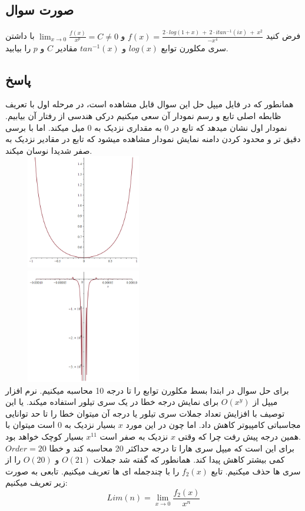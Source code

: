 \documentclass[12pt, letterpaper]{article}
\begin{document}
\subsection{صورت سوال}
فرض کنید
\(f(x) = \frac{2 \cdot log(1+x) \: + \: 2 \cdot i tan^{-1}(ix) \: + \: x^2}{-x^4}\)
و 
\(\lim_{x\to 0}\frac{f(x)}{x^p} = C \ne 0\)
با داشتن سری مکلورن توابع 
\(log(x)\)
و 
\(tan^{-1}(x)\)
مقادیر 
\(C\)
و 
\(p\)
را بیابید.

\subsection{پاسخ}
همانطور که در فایل میپل حل این سوال قابل مشاهده است، در مرحله اول با تعریف ظابطه اصلی تابع و رسم نمودار آن سعی میکنیم درکی هندسی از رفتار آن بیابیم. نمودار اول نشان میدهد که تابع در 0 به مقداری نزدیک به 0 میل میکند. اما با برسی دقیق تر و محدود کردن دامنه نمایش نمودار مشاهده میشود که تابع در مقادیر نزدیک به صفر شدیدا نوسان میکند. \\

\includegraphics[height=5cm, width=7cm]{figure1.png}
\includegraphics[height=5cm, width=7cm]{figure2.png}
\\


برای حل سوال در ابتدا بسط مکلورن توابع را تا درجه 10 محاسبه میکنیم. نرم افزار میپل از
\(O(x^y)\)
 برای نمایش درجه خطا در یک سری تیلور استفاده میکند. یا این توصیف با افزایش تعداد جملات سری تیلور یا درجه آن میتوان خطا را تا حد توانایی مجاسباتی کامپیوتر کاهش داد. اما چون در این مورد 
\(x\)
 بسیار نزدیک به 0 است میتوان با همین درجه پیش رفت چرا که وقتی 
\(x\) 
 نزدیک به صفر است 
\(x^{11}\)
 بسیار کوچک خواهد بود.
\\
\(Order=20\)
برای این است که میپل سری هارا تا درجه حداکثر 20 محاسبه کند و خطا کمی بیشتر کاهش پیدا کند. همانطور که گفته شد جملات
\(O(21)\)
و 
\(O(20)\)
را از سری ها حذف میکنیم. تابع 
\(f_2(x)\)
 را با چندجمله ای ها تعریف میکنیم. تابعی به صورت زیر تعریف میکنیم:
\[Lim(n) = \lim_{x\to 0}\frac {f_2(x)}{x^n}\]
\end{document}
